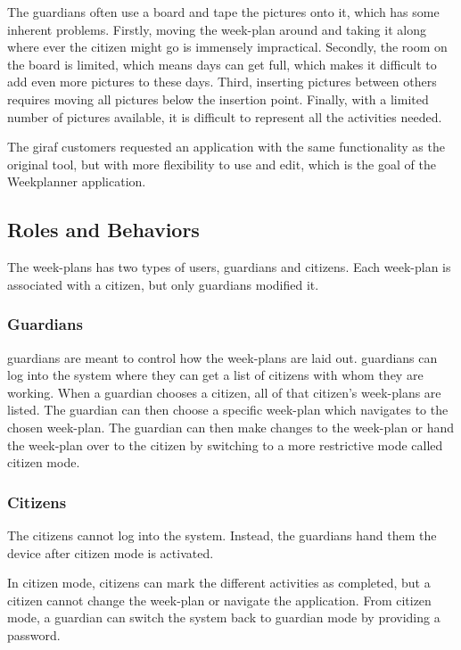 The \glspl{guardian} often use a board and tape the pictures onto it, which has some inherent problems. Firstly, moving the week-plan around and taking it along where ever the \gls{citizen} might go is immensely impractical. Secondly, the room on the board is limited, which means days can get full, which makes it difficult to add even more pictures to these days. Third, inserting pictures between others requires moving all pictures below the insertion point. Finally, with a limited number of pictures available, it is difficult to represent all the activities needed.

The \gls{giraf} customers requested an application with the same functionality as the original tool, but with more flexibility to use and edit, which is the goal of the Weekplanner application.

\subsection{Roles and Behaviors}

The week-plans has two types of users, \glspl{guardian} and \glspl{citizen}. Each week-plan is associated with a \gls{citizen}, but only \glspl{guardian}  modified it.

\subsubsection{Guardians}

\Glspl{guardian} are meant to control how the week-plans are laid out. \Glspl{guardian} can log into the system where they can get a list of \glspl{citizen} with whom they are working. When a \gls{guardian} chooses a \gls{citizen}, all of that \gls{citizen}'s week-plans are listed. The \gls{guardian} can then choose a specific week-plan which navigates to the chosen week-plan. The \gls{guardian} can then make changes to the week-plan or hand the week-plan over to the \gls{citizen} by switching to a more restrictive mode called \gls{citizen} mode.

\subsubsection{Citizens}

The \glspl{citizen} cannot log into the system. Instead, the \glspl{guardian} hand them the device after citizen mode is activated.

In citizen mode, \glspl{citizen} can mark the different activities as completed, but a citizen cannot change the week-plan or navigate the application. From citizen mode, a \gls{guardian} can switch the system back to guardian mode by providing a password.

